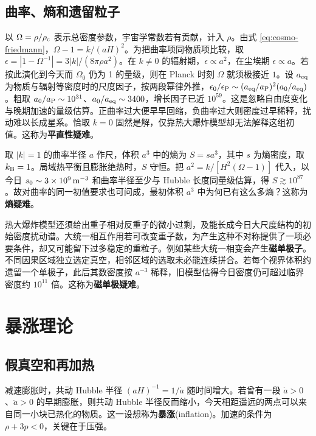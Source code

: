 \subsection{曲率、熵和遗留粒子}

以 $\Omega=\rho/\rho_{\rm c}$ 表示总密度参数，宇宙学常数若有贡献，计入 $\rho$。由式 \eqref{eq:cosmo-friedmann}，$\Omega-1=k/(aH)^2$。为把曲率项同物质项比较，取 $\epsilon=|1-\Omega^{-1}|=3|k|/(8\pi\rho a^2)$。在 $k\ne0$ 的辐射期，$\epsilon\propto a^2$，在尘埃期 $\epsilon\propto a$。若按此演化到今天而 $\Omega_0$ 仍为 1 的量级，则在 Planck 时刻 $\Omega$ 就须极接近 $1$。设 $a_{\rm eq}$ 为物质与辐射等密度时的尺度因子，按两段幂律外推，$\epsilon_0/\epsilon_{\rm P}\sim(a_{\rm eq}/a_{\rm P})^2(a_0/a_{\rm eq})$。粗取 $a_0/a_{\rm P}\sim10^{31}$、$a_0/a_{\rm eq}\sim3400$，增长因子已近 $10^{59}$。这是忽略自由度变化与晚期加速的量级估算。正曲率过大便早早回缩，负曲率过大则密度过早稀释，扰动难以长成星系。恰取 $k=0$ 固然是解，仅靠热大爆炸模型却无法解释这组初值。这称为\textbf{平直性疑难}。

取 $|k|=1$ 的曲率半径 $a$ 作尺，体积 $a^3$ 中的熵为 $S=sa^3$，其中 $s$ 为熵密度，取 $k_{\rm B}=1$。局域热平衡且膨胀绝热时，$S$ 守恒。把 $a^2=k/[H^2(\Omega-1)]$ 代入，以今日 $s_0\sim 3\times10^9\,{\rm m}^{-3}$ 和曲率半径至少与 Hubble 长度同量级估算，得 $S\gtrsim10^{87}$。故对曲率的同一初值要求也可问成，最初体积 $a^3$ 中为何已有这么多熵？这称为\textbf{熵疑难}。

热大爆炸模型还须给出重子相对反重子的微小过剩，及能长成今日大尺度结构的初始密度扰动谱。大统一相互作用若可改变重子数，为产生这种不对称提供了一项必要条件，却又可能留下过多稳定的重粒子。例如某些大统一相变会产生\textbf{磁单极子}。不同因果区域独立选定真空，相邻区域的选取未必能连续拼合。若每个视界体积约遗留一个单极子，此后其数密度按 $a^{-3}$ 稀释，旧模型估得今日密度仍可超过临界密度约 $10^{11}$ 倍。这称为\textbf{磁单极疑难}。

\section{暴涨理论}\label{sec:cosmo-inflation}

\subsection{假真空和再加热}

减速膨胀时，共动 Hubble 半径 $(aH)^{-1}=1/\dot a$ 随时间增大。若曾有一段 $\dot a>0$、$\ddot a>0$ 的早期膨胀，则共动 Hubble 半径反而缩小，今天相距遥远的两点可以来自同一小块已热化的物质。这一设想称为\textbf{暴涨}(inflation)。加速的条件为 $\rho+3p<0$，关键在于压强。

